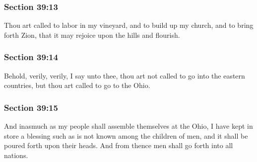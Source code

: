 	\subsubsection{Section 39:13} %
		\label{DC39-13}

		Thou art called to labor in my vineyard, and to build up my church, and to bring forth Zion, that it may rejoice upon the hills and flourish.


	\subsubsection{Section 39:14} %
		\label{DC39-14}

		Behold, verily, verily, I say unto thee, thou art not called to go into the eastern countries, but thou art called to go to the Ohio.


	\subsubsection{Section 39:15} %
		\label{DC39-15}

		And inasmuch as my people shall assemble themselves at the Ohio, I have kept in store a blessing such as is not known among the children of men, and it shall be poured forth upon their heads.  And from thence men shall go forth into all nations.



